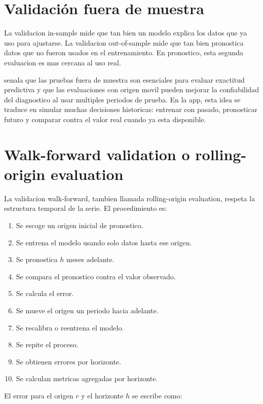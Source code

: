 ﻿\documentclass[12pt,letterpaper]{article}
\begin{document}
\section{Validación fuera de muestra}

La validacion in-sample mide que tan bien un modelo explica los datos que ya uso para ajustarse. La validacion out-of-sample mide que tan bien pronostica datos que no fueron usados en el entrenamiento. En pronostico, esta segunda evaluacion es mas cercana al uso real.

\citet{tashman2000} senala que las pruebas fuera de muestra son esenciales para evaluar exactitud predictiva y que las evaluaciones con origen movil pueden mejorar la confiabilidad del diagnostico al usar multiples periodos de prueba. En la app, esta idea se traduce en simular muchas decisiones historicas: entrenar con pasado, pronosticar futuro y comparar contra el valor real cuando ya esta disponible.

\section{Walk-forward validation o rolling-origin evaluation}

La validacion walk-forward, tambien llamada rolling-origin evaluation, respeta la estructura temporal de la serie. El procedimiento es:

\begin{enumerate}[leftmargin=*]
    \item Se escoge un origen inicial de pronostico.
    \item Se entrena el modelo usando solo datos hasta ese origen.
    \item Se pronostica \(h\) meses adelante.
    \item Se compara el pronostico contra el valor observado.
    \item Se calcula el error.
    \item Se mueve el origen un periodo hacia adelante.
    \item Se recalibra o reentrena el modelo.
    \item Se repite el proceso.
    \item Se obtienen errores por horizonte.
    \item Se calculan metricas agregadas por horizonte.
\end{enumerate}

El error para el origen \(r\) y el horizonte \(h\) se escribe como:
\end{document}
